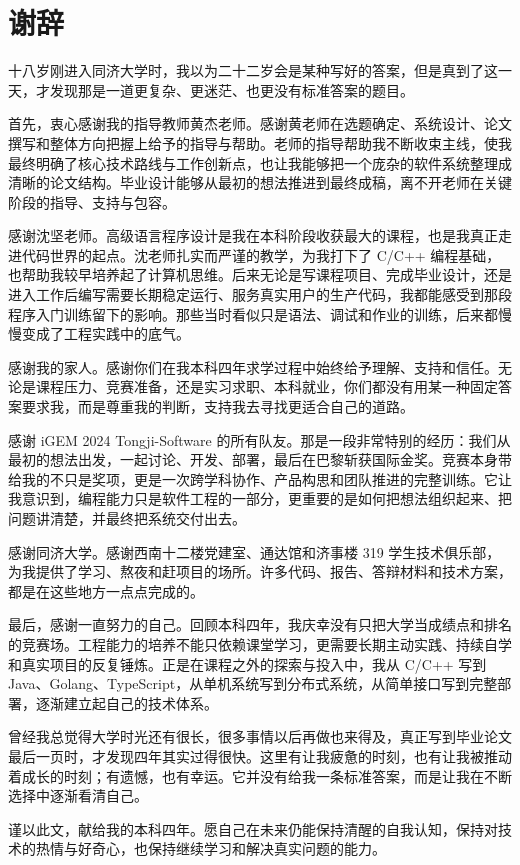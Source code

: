 \chapter*{谢辞}

十八岁刚进入同济大学时，我以为二十二岁会是某种写好的答案，但是真到了这一天，才发现那是一道更复杂、更迷茫、也更没有标准答案的题目。

首先，衷心感谢我的指导教师黄杰老师。感谢黄老师在选题确定、系统设计、论文撰写和整体方向把握上给予的指导与帮助。老师的指导帮助我不断收束主线，使我最终明确了核心技术路线与工作创新点，也让我能够把一个庞杂的软件系统整理成清晰的论文结构。毕业设计能够从最初的想法推进到最终成稿，离不开老师在关键阶段的指导、支持与包容。

感谢沈坚老师。高级语言程序设计是我在本科阶段收获最大的课程，也是我真正走进代码世界的起点。沈老师扎实而严谨的教学，为我打下了 C/C++ 编程基础，也帮助我较早培养起了计算机思维。后来无论是写课程项目、完成毕业设计，还是进入工作后编写需要长期稳定运行、服务真实用户的生产代码，我都能感受到那段程序入门训练留下的影响。那些当时看似只是语法、调试和作业的训练，后来都慢慢变成了工程实践中的底气。

感谢我的家人。感谢你们在我本科四年求学过程中始终给予理解、支持和信任。无论是课程压力、竞赛准备，还是实习求职、本科就业，你们都没有用某一种固定答案要求我，而是尊重我的判断，支持我去寻找更适合自己的道路。

感谢 iGEM 2024 Tongji-Software 的所有队友。那是一段非常特别的经历：我们从最初的想法出发，一起讨论、开发、部署，最后在巴黎斩获国际金奖。竞赛本身带给我的不只是奖项，更是一次跨学科协作、产品构思和团队推进的完整训练。它让我意识到，编程能力只是软件工程的一部分，更重要的是如何把想法组织起来、把问题讲清楚，并最终把系统交付出去。

感谢同济大学。感谢西南十二楼党建室、通达馆和济事楼 319 学生技术俱乐部，为我提供了学习、熬夜和赶项目的场所。许多代码、报告、答辩材料和技术方案，都是在这些地方一点点完成的。

最后，感谢一直努力的自己。回顾本科四年，我庆幸没有只把大学当成绩点和排名的竞赛场。工程能力的培养不能只依赖课堂学习，更需要长期主动实践、持续自学和真实项目的反复锤炼。正是在课程之外的探索与投入中，我从 C/C++ 写到 Java、Golang、TypeScript，从单机系统写到分布式系统，从简单接口写到完整部署，逐渐建立起自己的技术体系。

曾经我总觉得大学时光还有很长，很多事情以后再做也来得及，真正写到毕业论文最后一页时，才发现四年其实过得很快。这里有让我疲惫的时刻，也有让我被推动着成长的时刻；有遗憾，也有幸运。它并没有给我一条标准答案，而是让我在不断选择中逐渐看清自己。

谨以此文，献给我的本科四年。愿自己在未来仍能保持清醒的自我认知，保持对技术的热情与好奇心，也保持继续学习和解决真实问题的能力。
